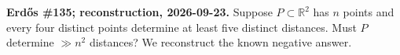 \textbf{Erd\H{o}s \#135; reconstruction, 2026-09-23.}
Suppose $P\subset\mathbb R^2$ has $n$ points and every four distinct
points determine at least five distinct distances. Must $P$ determine
$\gg n^2$ distances? We reconstruct the known negative answer.
